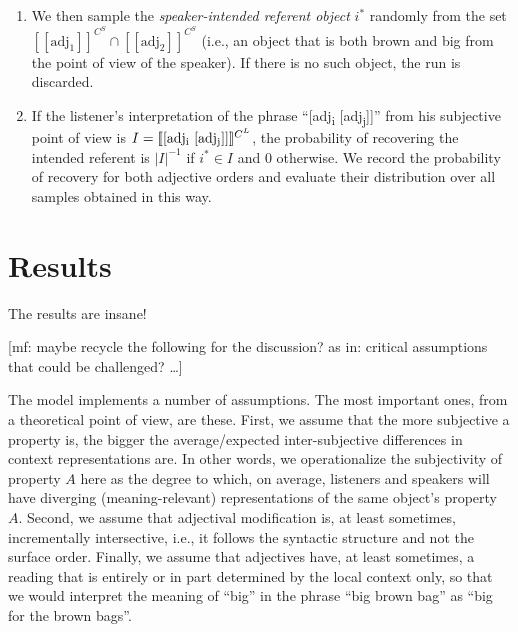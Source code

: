 \documentclass[10pt,a4paper]{article}
\newcommand{\den}[1]{\ensuremath{[\![#1]\!]}}
\newcommand{\mf}[1]{\textcolor{BrickRed}{[mf: #1]}}
\begin{document}
\begin{enumerate}
  \mf{Should some of this go into the previous section on semantics? --- I tend to say yes.}
\item We then sample the \emph{speaker-intended referent object} $i^*$ randomly from the set $\den{\text{adj}_1}^{C^S} \cap \den{\text{adj}_2}^{C^S}$ (i.e., an object that is both brown and big from the point of view of the speaker). If there is no such object, the run is discarded.
\item If the listener's interpretation of the phrase ``[adj\textsubscript{i} [adj\textsubscript{j}]]'' from his subjective point of view is $I = \den{\text{[adj\textsubscript{i} [adj\textsubscript{j}]]}}^{C^L}$, the probability of recovering the intended referent is $|I|^{-1}$ if $i^* \in I$ and 0 otherwise. We record the probability of recovery for both adjective orders and evaluate their distribution over all samples obtained in this way.
\end{enumerate}

\section{Results}

The results are insane!

\bigskip
\bigskip
\bigskip

\mf{maybe recycle the following for the discussion? as in: critical assumptions that could be challenged? \dots}

The model implements a number of assumptions. The most important ones, from a theoretical point of view, are these. First, we assume that the more subjective a property is, the bigger the average/expected inter-subjective differences in context representations are. In other words, we operationalize the subjectivity of property $A$ here as the degree to which, on average, listeners and speakers will have diverging (meaning-relevant) representations of the same object's property $A$. Second, we assume that adjectival modification is, at least sometimes, incrementally intersective, i.e., it follows the syntactic structure and not the surface order. Finally, we assume that adjectives have, at least sometimes, a reading that is entirely or in part determined by the local context only, so that we would interpret the meaning of ``big''  in the phrase ``big brown bag'' as ``big for the brown bags''.

\bigskip






\setlength{\bibleftmargin}{.125in}
\setlength{\bibindent}{-\bibleftmargin}


\end{document}
